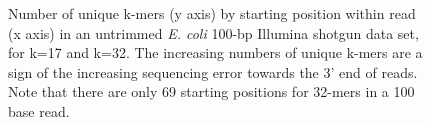 \documentclass{article}
\begin{document}
\begin{figure}
\caption{Number of unique k-mers (y axis) by starting position within read (x axis) in an untrimmed {\em E. coli} 100-bp Illumina shotgun data set, for k=17 and k=32.  The increasing numbers of unique k-mers are a sign of the increasing sequencing error towards the 3' end of reads.  Note that there are only 69 starting positions for 32-mers in a 100 base read.}
\label{perc_unique_pos}
\end{figure}
\end{document}
